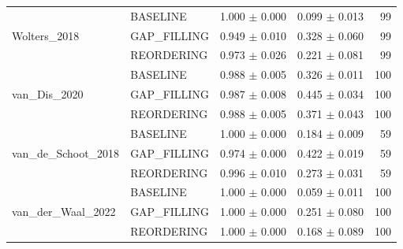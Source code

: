 \begin{table}[htbp]
\begin{tabular}{llrrr}
\cline{1-5}
\multirow[t]{3}{*}{Wolters_2018} & BASELINE & 1.000 $\pm$ 0.000 & 0.099 $\pm$ 0.013 & 99 \\
 & GAP_FILLING & 0.949 $\pm$ 0.010 & 0.328 $\pm$ 0.060 & 99 \\
 & REORDERING & 0.973 $\pm$ 0.026 & 0.221 $\pm$ 0.081 & 99 \\
\cline{1-5}
\multirow[t]{3}{*}{van_Dis_2020} & BASELINE & 0.988 $\pm$ 0.005 & 0.326 $\pm$ 0.011 & 100 \\
 & GAP_FILLING & 0.987 $\pm$ 0.008 & 0.445 $\pm$ 0.034 & 100 \\
 & REORDERING & 0.988 $\pm$ 0.005 & 0.371 $\pm$ 0.043 & 100 \\
\cline{1-5}
\multirow[t]{3}{*}{van_de_Schoot_2018} & BASELINE & 1.000 $\pm$ 0.000 & 0.184 $\pm$ 0.009 & 59 \\
 & GAP_FILLING & 0.974 $\pm$ 0.000 & 0.422 $\pm$ 0.019 & 59 \\
 & REORDERING & 0.996 $\pm$ 0.010 & 0.273 $\pm$ 0.031 & 59 \\
\cline{1-5}
\multirow[t]{3}{*}{van_der_Waal_2022} & BASELINE & 1.000 $\pm$ 0.000 & 0.059 $\pm$ 0.011 & 100 \\
 & GAP_FILLING & 1.000 $\pm$ 0.000 & 0.251 $\pm$ 0.080 & 100 \\
 & REORDERING & 1.000 $\pm$ 0.000 & 0.168 $\pm$ 0.089 & 100 \\
\cline{1-5}
\bottomrule
\end{tabular}
\end{table}
